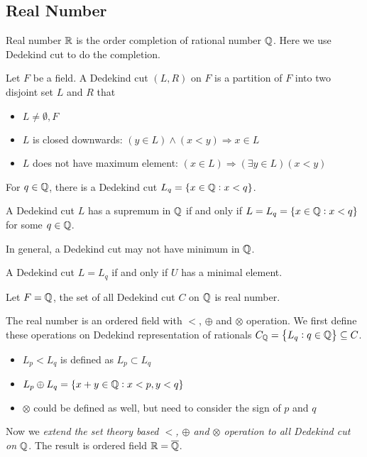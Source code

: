 \subsection{Real Number}

Real number $\mathbb{R}$ is the order completion of rational number $\mathbb{Q}$. Here we use Dedekind cut to do the completion.

\begin{definition}
    Let $F$ be a field. A Dedekind cut $(L,R)$ on $F$ is a partition of $F$ into two disjoint set $L$ and $R$ that
    \begin{itemize}
        \item $L \neq \emptyset, F$
        \item $L$ is closed downwards: $(y \in L) \wedge (x < y) \Rightarrow x \in L$
        \item $L$ does not have maximum element: $(x \in L) \Rightarrow (\exists y \in L) (x < y)$
    \end{itemize}
\end{definition}
    
\begin{definition}
    For $q \in \mathbb{Q}$, there is a Dedekind cut $L_q = \set{x\in \mathbb{Q}: x < q}$.
\end{definition}

\begin{theorem}
     A Dedekind cut $L$ has a supremum in $\mathbb{Q}$ if and only if $L = L_q = \set{x \in \mathbb{Q}: x < q}$ for some $q\in \mathbb{Q}$.
     
     In general, a Dedekind cut may not have minimum in $\mathbb{Q}$.
\end{theorem}

\begin{theorem}
    A Dedekind cut $L = L_q$  if and only if $U$ has a minimal element.
\end{theorem}


\begin{definition}
    Let $F=\mathbb{Q}$, the set of all Dedekind cut $C$ on $\mathbb{Q}$ is real number.
    
    The real number is an ordered field with $<$, $\oplus$ and $\otimes$ operation. We first define these operations on Dedekind representation of rationals $C_{\mathbb{Q}} = \set{L_q: q \in \mathbb{Q}} \subseteq C$.
    \begin{itemize}
        \item $L_p < L_q$ is defined as $L_p \subset L_q$
        \item $L_p \oplus L_q = \set{x + y \in \mathbb{Q}: x < p, y < q}$
        \item $\otimes$ could be defined as well, but need to consider the sign of $p$ and $q$
    \end{itemize}    
    
    Now we \emph{extend the set theory based $<$, $\oplus$ and $\otimes$ operation to all Dedekind cut on $\mathbb{Q}$}. The result is ordered field $\mathbb{R} = \overline{\mathbb{Q}}$.
\end{definition}



